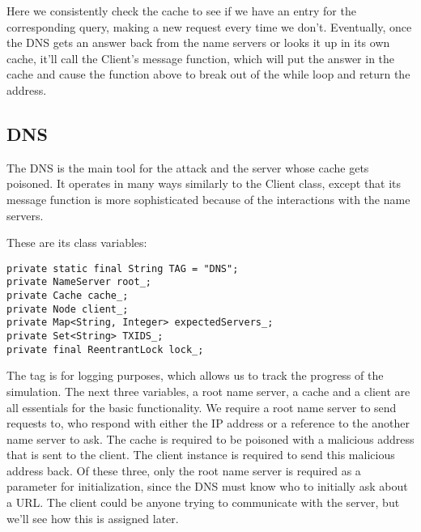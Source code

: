 \documentclass[a4paper, 12pt]{article} %
\begin{document}
Here we consistently check the cache to see if we have an entry for the corresponding query, making a new request every time we don’t. Eventually, once the DNS gets an answer back from the name servers or looks it up in its own cache, it’ll call the Client’s message function, which will put the answer in the cache and cause the function above to break out of the while loop and return the address. 

\subsection*{DNS}

The DNS is the main tool for the attack and the server whose cache gets poisoned. It operates in many ways similarly to the Client class, except that its message function is more sophisticated because of the interactions with the name servers.

These are its class variables:

\begin{lstlisting}
private static final String TAG = "DNS";	
private NameServer root_;
private Cache cache_;
private Node client_;
private Map<String, Integer> expectedServers_;
private Set<String> TXIDS_;
private final ReentrantLock lock_;
\end{lstlisting}

The tag is for logging purposes, which allows us to track the progress of the simulation. The next three variables, a root name server, a cache and a client are all essentials for the basic functionality. We require a root name server to send requests to, who respond with either the IP address or a reference to the another name server to ask. The cache is required to be poisoned with a malicious address that is sent to the client. The client instance is required to send this malicious address back. Of these three, only the root name server is required as a parameter for initialization, since the DNS must know who to initially ask about a URL. The client could be anyone trying to communicate with the server, but we’ll see how this is assigned later. 
\end{document}
